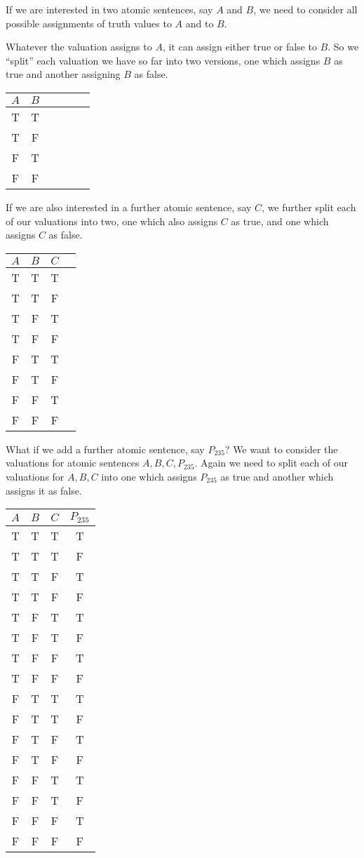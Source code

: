 If we are interested in two atomic sentences, say $A$ and $B$, we need to consider all possible assignments of truth values to $A$ and to $B$. 

Whatever the valuation assigns to $A$, it can assign either true or false to $B$. So we ``split'' each valuation we have so far into two versions, one which assigns $B$ as true and another assigning $B$ as false. 

\begin{center}
	\begin{tabular}{cccccc}
		 $A$&$B$\\\hline
	T&T\\
	T&F\\
	F&T\\
	F&F
	\end{tabular}
\end{center}

If we are also interested in a further atomic sentence, say $C$, we further split each of our valuations into two, one which also assigns $C$ as true, and one which assigns $C$ as false.

\begin{center}
	\begin{tabular}{cccc}
		$A$&$B$&$C$&\\\hline
		T& T &T&\\
		T & T & F&\\
		T & F & T& \\
		T & F &F&\\
		F & T &T&\\
		F& T & F & \\
		F & F & T &\\
		F & F & F& 
	\end{tabular}
\end{center}


What if we add a further atomic sentence, say $P_{235}$? We want to consider the valuations for atomic sentences $A,B,C,P_{235}$.
Again we need to split each of our valuations for $A,B,C$ into one which assigns $P_{235}$ as true and another which assigns it as false. 

\begin{center} \begin{tabular}{cccc} $A$ & $B$ & $C$ & $P_{235}$\\\hline T & T & T & T\\ T & T & T & F\\ T & T & F & T\\ T & T & F & F\\ T & F & T & T\\ T & F & T & F\\ T & F & F & T\\ T & F & F & F\\ F & T & T & T\\ F & T & T & F\\ F & T & F & T\\ F & T & F & F\\ F & F & T & T\\ F & F & T & F\\ F & F & F & T\\ F & F & F & F \end{tabular} \end{center}


